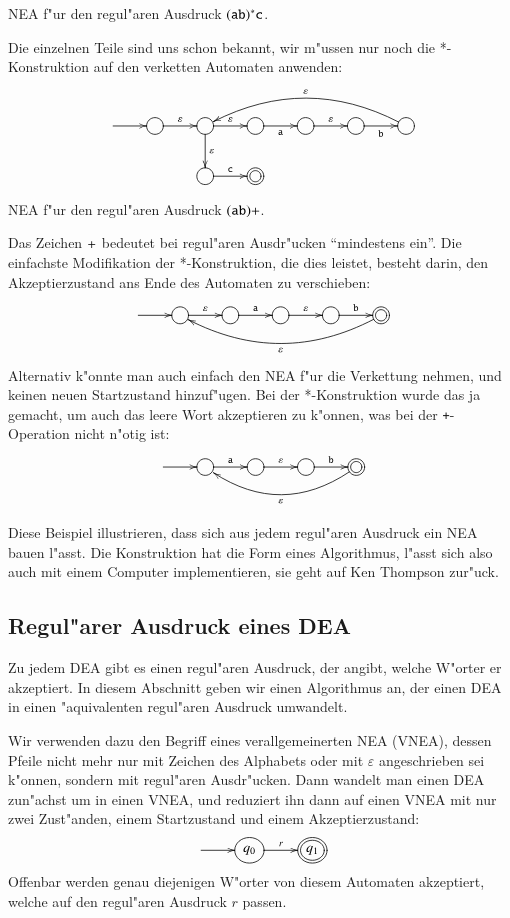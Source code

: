 \begin{beispiel}[\bf Beispiel 2] NEA f"ur den regul"aren Ausdruck
$({\tt ab})^*{\tt c}$. 

Die einzelnen Teile sind uns schon bekannt, wir m"ussen nur noch
die *-Konstruktion auf den verketten Automaten anwenden:
\[
\entrymodifiers={++[o][F]}
\xymatrix{
*+\txt{}\ar[r]
	&{}\ar[r]^{\varepsilon}
		&{}\ar[r]^{\varepsilon}
			\ar[d]^{\varepsilon}
			&\ar[r]_{\tt a}
				&{}\ar[r]^{\varepsilon}
					&{}\ar[r]_{\tt b}
						&{}\ar@/_20pt/[llll]_{\varepsilon}
\\
*+\txt{}
	&*+\txt{}
		&{}\ar[r]^{\tt c}
			&*++[o][F=]{}
}
\]
\end{beispiel}

\begin{beispiel}[\bf Beispiel 3:] NEA f"ur den regul"aren Ausdruck
$({\tt ab})+$.

Das Zeichen ${\tt+}$ bedeutet bei regul"aren Ausdr"ucken ``mindestens ein''.
Die einfachste Modifikation der *-Konstruktion, die dies leistet, besteht
darin, den Akzeptierzustand ans Ende des Automaten zu verschieben:
\[
\entrymodifiers={++[o][F]}
\xymatrix{
*+\txt{}\ar[r]
	&{}\ar[r]^{\varepsilon}
		&{}\ar[r]^{\tt a}
			&{}\ar[r]^{\varepsilon}
				&{}\ar[r]^{\tt b}
					&*++[o][F=]{}\ar@/^20pt/[llll]^{\varepsilon}
}
\]
Alternativ k"onnte man auch einfach den NEA f"ur die Verkettung
nehmen, und keinen neuen Startzustand hinzuf"ugen. Bei der
*-Konstruktion wurde das ja gemacht, um auch das leere Wort
akzeptieren zu k"onnen, was bei der {\tt +}-Operation nicht
n"otig ist:
\[
\entrymodifiers={++[o][F]}
\xymatrix{
*+\txt{}\ar[r]
	&{}\ar[r]^{\tt a}
		&{}\ar[r]^{\varepsilon}
			&{}\ar[r]^{\tt b}
				&*++[o][F=]{}\ar@/^20pt/[lll]^{\varepsilon}
}
\]
\end{beispiel}
Diese Beispiel illustrieren, dass sich aus jedem regul"aren Ausdruck
ein NEA bauen l"asst. Die Konstruktion hat die Form eines Algorithmus,
l"asst sich also auch mit einem Computer implementieren, sie geht
auf Ken Thompson zur"uck.

\subsection{Regul"arer Ausdruck eines DEA\label{regulaer:dea-re}}
Zu jedem DEA gibt es einen regul"aren Ausdruck, der angibt,
welche W"orter er akzeptiert.  In diesem Abschnitt geben
wir einen Algorithmus an, der einen DEA in einen "aquivalenten
regul"aren Ausdruck umwandelt. 

Wir verwenden dazu den Begriff eines verallgemeinerten NEA (VNEA),
dessen Pfeile nicht mehr nur mit Zeichen des Alphabets oder mit
$\varepsilon$ angeschrieben sei k"onnen, sondern mit regul"aren
Ausdr"ucken. Dann wandelt man einen DEA zun"achst um in einen
VNEA, und reduziert ihn dann auf einen VNEA mit nur zwei Zust"anden,
einem Startzustand und einem Akzeptierzustand:
\[
\entrymodifiers={++[o][F]}
\xymatrix{
*+\txt{}\ar[r]
	&{q_0}\ar[r]^{r}
		&*++[o][F=]{q_1}
}
\]
Offenbar werden genau diejenigen W"orter von diesem Automaten
akzeptiert, welche auf den regul"aren Ausdruck $r$ passen.

